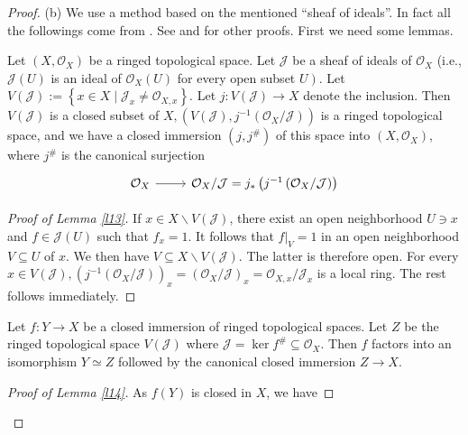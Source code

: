 \begin{proof}
	(b) We use a method based on the mentioned ``sheaf of ideals''. In fact all the followings come from \cite[Ch. 2, Prop. 3.20, P. 47]{LIU}. See \cite[Ch. 3, Th. 3.42, P. 84]{GW} and \cite[P. 32]{BAG} for other proofs. First we need some lemmas.
	\begin{lm}
		\label{l13}
		Let $\left(X, \mathcal{O}_{X}\right)$ be a ringed topological space. Let $\mathcal{J}$ be a sheaf of ideals of $\mathcal{O}_{X}$ (i.e., $\mathcal{J}(U)$ is an ideal of $\mathcal{O}_{X}(U)$ for every open subset $\left.U\right)$. Let $V(\mathcal{J}):=\left\{x \in X \mid \mathcal{J}_{x} \neq \mathcal{O}_{X, x}\right\} .$ Let $j: V(\mathcal{J}) \rightarrow X$ denote the inclusion. Then $V(\mathcal{J})$ is a closed subset of $X,\left(V(\mathcal{J}), j^{-1}\left(\mathcal{O}_{X} / \mathcal{J}\right)\right)$ is a ringed topological space, and we have a closed immersion $\left(j, j^{\#}\right)$ of this space into $\left(X, \mathcal{O}_{X}\right)$, where $j^{\#}$ is the canonical surjection
		\begin{equation*}
			\begin{tikzcd}
				\mathcal{O}_{X} \arrow[r] & \mathcal{O}_{X} / \mathcal{J}=j_{*}\left(j^{-1}\left(\mathcal{O}_{X} / \mathcal{J}\right)\right)
			\end{tikzcd}
		\end{equation*}
	\end{lm}
	\begin{proof}[Proof of Lemma \ref*{l13}]
		If $x \in X \backslash V(\mathcal{J})$, there exist an open neighborhood $U \ni x$ and $f \in \mathcal{J}(U)$ such that $f_{x}=1$. It follows that $\left.f\right|_{V}=1$ in an open neighborhood $V \subseteq U$ of $x$. We then have $V \subseteq X \backslash V(\mathcal{J})$. The latter is therefore open. For every $x \in V(\mathcal{J}),\left(j^{-1}\left(\mathcal{O}_{X} / \mathcal{J}\right)\right)_{x}=\left(\mathcal{O}_{X} / \mathcal{J}\right)_{x}=\mathcal{O}_{X, x} / \mathcal{J}_{x}$ is a local ring.
		The rest follows immediately.
	\end{proof}
	\begin{lm}
		\label{l14}
		Let $f: Y \rightarrow X$ be a closed immersion of ringed topological spaces. Let $Z$ be the ringed topological space $V(\mathcal{J})$ where $\mathcal{J}=\ker f^{\#} \subseteq \mathcal{O}_{X} .$ Then $f$ factors into an isomorphism $Y \simeq Z$ followed by the canonical closed immersion $Z \rightarrow X$.
	\end{lm}
	\begin{proof}[Proof of Lemma \ref*{l14}]
		As $f(Y)$ is closed in $X$, we have

\end{proof}
\end{proof}

